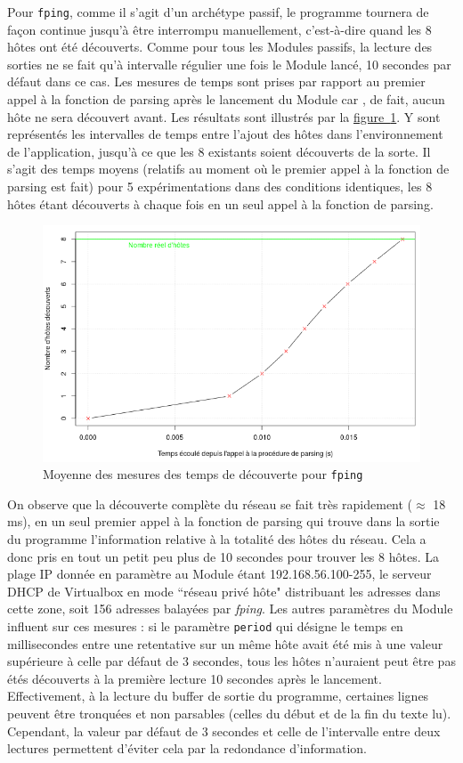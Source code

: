 \documentclass[]{article}
\newcommand{\wordlink}[2]{\hyperref[#1]{#2~\ref{#1}}}
\begin{document}
\par Pour \texttt{fping}, comme il s'agit d'un archétype passif, le programme tournera de façon continue jusqu'à être interrompu manuellement, c'est-à-dire quand les 8 hôtes ont été découverts. Comme pour tous les Modules passifs, la lecture des sorties ne se fait qu'à intervalle régulier une fois le Module lancé, 10 secondes par défaut dans ce cas. Les mesures de temps sont prises par rapport au premier appel à la fonction de parsing après le lancement du Module car , de fait, aucun hôte ne sera découvert avant. Les résultats sont illustrés par la \wordlink{fpingmean}{figure}. Y sont représentés les intervalles de temps entre l'ajout des hôtes dans l'environnement de l'application, jusqu'à ce que les 8 existants soient découverts de la sorte. Il s'agit des temps moyens (relatifs au moment où le premier appel à la fonction de parsing est fait) pour 5 expérimentations dans des conditions identiques, les 8 hôtes étant découverts à chaque fois en un seul appel à la fonction de parsing.\\

\begin{figure}[!ht]
\centering
     \includegraphics[width=0.75\linewidth]{fpingmean}
     \caption{Moyenne des mesures des temps de découverte pour \texttt{fping}}
     \label{fpingmean}
\end{figure}

\vspace{0.1cm}

On observe que la découverte complète du réseau se fait très rapidement ($\approx$ 18 ms), en un seul premier appel à la fonction de parsing qui trouve dans la sortie du programme l'information relative à la totalité des hôtes du réseau. Cela a donc pris en tout un petit peu plus de 10 secondes pour trouver les 8 hôtes. La plage IP donnée en paramètre au Module étant 192.168.56.100-255, le serveur DHCP de Virtualbox en mode ``réseau privé hôte" distribuant les adresses dans cette zone, soit 156 adresses balayées par \textit{fping}. Les autres paramètres du Module influent sur ces mesures : si le paramètre \texttt{period} qui désigne le temps en millisecondes entre une retentative sur un même hôte avait été mis à une valeur supérieure à celle par défaut de 3 secondes, tous les hôtes n'auraient peut être pas étés découverts à la première lecture 10 secondes après le lancement. Effectivement, à la lecture du buffer de sortie du programme, certaines lignes peuvent être tronquées et non parsables (celles du début et de la fin du texte lu). Cependant, la valeur par défaut de 3 secondes et celle de l'intervalle entre deux lectures permettent d'éviter cela par la redondance d'information.
\end{document}
